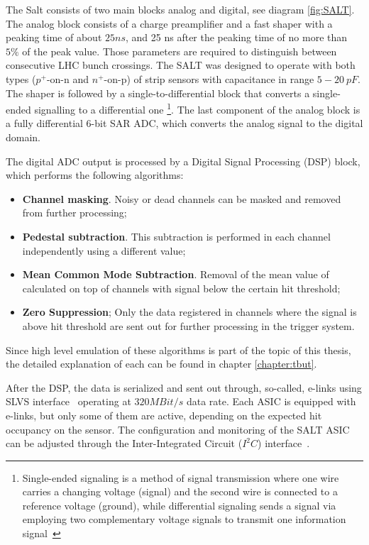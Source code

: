 The Salt consists of two main blocks analog and digital, see diagram \ref{fig:SALT}. The analog block consists of a charge preamplifier and a fast shaper with a peaking time of about $25 ns$, and 25 ns after the peaking time of no more than $5\%$ of the peak value.  Those parameters are required to distinguish between consecutive LHC bunch crossings. The SALT was designed to operate with both types ($p^{+}\text{-on-n}$ and $n^{+}\text{-on-p}$) of strip sensors with capacitance in range $5-20~ pF$. 
The shaper is followed by a single-to-differential block that converts a single-ended signalling to a differential one \footnote{Single-ended signaling is a method of signal transmission where one wire carries a changing voltage (signal) and the second wire is connected to a reference voltage (ground), while differential signaling sends a signal via employing two complementary voltage signals to transmit one information signal~\cite{signals}}. The last component of the analog block is a fully differential 6-bit SAR ADC, which converts the analog signal to the digital domain. 

The digital ADC output is processed by a Digital Signal Processing (DSP) block, which performs the following algorithms: 

\begin{itemize}
    \item \textbf{Channel masking}. Noisy or dead channels can be masked and removed from further processing; 
    \item \textbf{Pedestal subtraction}. This subtraction is performed in each channel independently using a different value;
    \item \textbf{Mean Common Mode Subtraction}. Removal of the mean value of calculated on top of channels with signal below the certain hit threshold; 
    \item \textbf{Zero Suppression}; Only the data registered in channels where the signal is above hit threshold are sent out for further processing in the trigger system.
\end{itemize}

Since high level emulation of these algorithms is part of the topic of this thesis, the detailed explanation of each can be found in chapter \ref{chapter:tbut}. 

After the DSP, the data is serialized and sent out through, so-called, e-links using SLVS interface~\cite{SLVS} operating at $320 MBit/s$ data rate. Each ASIC is equipped with  e-links, but only some of them are active, depending on the expected hit occupancy on the sensor.  The configuration and monitoring of the SALT ASIC can be adjusted through the Inter-Integrated
Circuit ($I^{2}C$) interface~\cite{i2c}.
